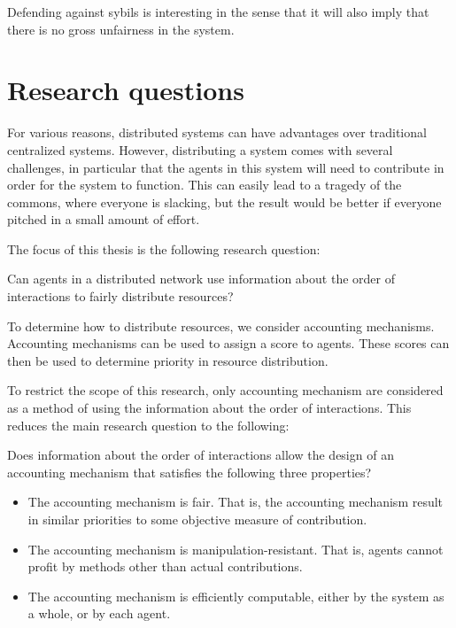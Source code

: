 \documentclass[a4paper,11pt]{book}
\theoremstyle{definition}
\begin{document}
Defending against sybils is interesting in the sense
that it will also imply that there is no gross unfairness in the system.
\chapter{Research questions}

For various reasons, distributed systems can have advantages over traditional centralized
systems. However, distributing a system comes with several challenges, in particular that
the agents in this system will need to contribute in order for the system to
function. This can easily lead to a tragedy of the commons, where everyone is slacking,
but the result would be better if everyone pitched in a small amount of effort.

The focus of this thesis is the following research question:

\begin{center}
    Can agents in a distributed network use information about the order of
    interactions to fairly distribute resources?
\end{center}

To determine how to distribute resources, we consider accounting mechanisms. Accounting
mechanisms can be used to assign a score to agents. These scores can then
be used to determine priority in resource distribution.

To restrict the scope of this research, only accounting mechanism are considered as a method
of using the information about the order of interactions. This reduces the main research question
to the following:

Does information about the order of interactions allow the design of an accounting mechanism
that satisfies the following three properties?

\begin{itemize}
    \item The accounting mechanism is fair. That is, the accounting mechanism result in
        similar priorities to some objective measure of contribution.
    \item The accounting mechanism is manipulation-resistant. That is, agents 
        cannot profit by methods other than actual contributions.
    \item The accounting mechanism is efficiently computable, either by the system as a whole,
        or by each agent.
\end{itemize}
\end{document}
